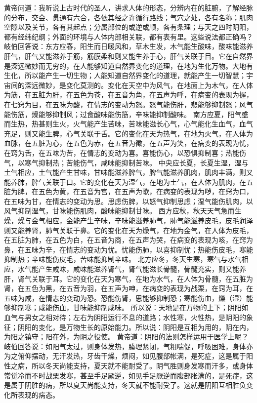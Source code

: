 \documentclass[a4paper,12pt,UTF8,twoside]{ctexbook}
\begin{document}
黄帝问道：我听说上古时代的圣人，讲求人体的形态，分辨内在的脏腑，了解经脉的分布，交会、贯通有六合，各依其经之许循行路线；气穴之处，各有名称；肌肉空隙以及关节，各有其起点；分属部位的或逆或顺，各有条理；与天之四时阴阳，都有经纬纪纲；外面的环境与人体内部相关联，都有表有里。这些说法都正确吗？
岐伯回答说：东方应春，阳生而日暖风和，草木生发，木气能生酸味，酸味能滋养肝气，肝气又能滋养于筋，筋膜柔和则又能生养于心，肝气关联于目。它在自然界是深远微妙而无穷的，在人能够知道自然界变化的道理，在地为生化万物。大地有生化，所以能产生一切生物；人能知道自然界变化的道理，就能产生一切智慧；宇宙间的深远微妙，是变化莫测的。变化在天空中为风气，在地面上为木气，在人体为筋，在五脏为肝，在五色为苍，在五音为角，在五声为呼，在病变的表现为握，在七窍为目，在五味为酸，在情志的变动为怒。怒气能伤肝，悲能够抑制怒；风气能伤筋，燥能够抑制风；过食酸味能伤筋，辛味能抑制酸味。
南方应夏，阳气盛而生热，热甚则生火，火气能产生苦味，苦味能滋长心气，心气能化生血气，血气充足，则又能生脾，心气关联于舌。它的变化在天为热气，在地为火气，在人体为血脉，在五脏为心，在五色为赤，在五音为徵，在五声为笑，在病变的表现为忧，在窍为舌，在五味为苦，在情志的变动为喜。喜能伤心，以恐惧抑制喜；热能伤气，以寒气抑制热；苦能伤气，咸味能抑制苦味。
中央应长夏，长夏生湿，湿与土气相应，土气能产生甘味，甘味能滋养脾气，脾气能滋养肌肉，肌肉丰满，则又能养肺，脾气关联于口。它的变化在天为湿气，在地为土气，在人体为肌肉，在五脏为脾，在五色为黄，在五音为宫，在五声为歌，在病变的表现为哕，在窍为口，在五味为甘，在情志的变动为思。思虑伤脾，以怒气抑制思虑；湿气能伤肌肉，以风气抑制湿气，甘味能伤肌肉，酸味能抑制甘味。
西方应秋，秋天天气急而生燥，燥与金气相应，金能产生辛味，辛味能滋养肺气，肺气能滋养皮毛，皮毛润泽则又能养肾，肺气关联于鼻。它的变化在天为燥气，在地为金气，在人体为皮毛，在五脏为肺，在五色为白，在五音为商，在五声为哭，在病变的表现为咳，在窍为鼻，在五味为辛，在情志的变动为忧。忧能伤肺，以喜抑制忧；热能伤皮毛，寒能抑制热；辛味能伤皮毛，苦味能抑制辛味。
北方应冬，冬天生寒，寒气与水气相应，水气能产生咸味，咸味能滋养肾气，肾气能滋长骨髓，骨髓充实，则又能养肝，肾气关联于耳。它的变化在天为寒气，在地为水气，在人体为骨髓，在五脏为肾，在五色为黑，在五音为羽，在五声为呻，在病变的表现为战栗，在窍为耳，在五味为咸，在情志的变动为恐。恐能伤肾，思能够抑制恐；寒能伤血，燥（湿）能够抑制寒；咸能伤血，甘味能抑制咸味。
所以说：天地是在万物的上下；阴阳如血气与男女之相对待；左右为阴阳运行不息的道路；水性寒，火性热，是阴阳的象征；阴阳的变化，是万物生长的原始能力。所以说：阴阳是互相为用的，阴在内，为阳之镇守；阳在外，为阴之役使。
黄帝道：阴阳的法则怎样运用于医学上呢？岐伯回答说：如阳气太过，则身体发热，腠理紧闭，气粗喘促，呼吸困难，身体亦为之俯仰摆动，无汗发热，牙齿干燥，烦闷，如见腹部帐满，是死症，这是属于阳性之病，所以冬天尚能支持，夏天就不能耐受了。阴气胜则身发寒而汗多，或身体常觉冷而不时战栗发寒，甚至手足厥逆，如见手足厥逆而腹部胀满的，是死症，这是属于阴胜的病，所以夏天尚能支持，冬天就不能耐受了。这就是阴阳互相胜负变化所表现的病态。
\end{document}
